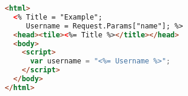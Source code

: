 \begin{lstlisting}[language=aspx, caption=Example of a simple ASP.NET Web Form page., label=code:simple-aspx, float]
<html>
  <% Title = "Example";
	 Username = Request.Params["name"]; %>
  <head><tile><%= Title %></title></head>
  <body>
    <script>
      var username = "<%= Username %>";
    </script>
  </body>
</html>
\end{lstlisting}
